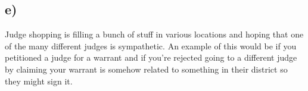 \documentclass{article}
\begin{document}
\subsection{e)} %
\label{sub:e_}
Judge shopping is filling a bunch of stuff in various locations and hoping that one of the many different judges is sympathetic. An example of this would be if you petitioned a judge for a warrant and if you're rejected going to a different judge by claiming your warrant is somehow related to something in their district so they might sign it.


\end{document}
